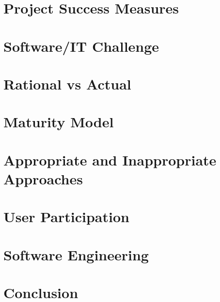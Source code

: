 \documentclass[a4paper,12pt]{scrartcl}
\begin{document}
	\section{Project Success Measures}
	{
		
	}
	\section{Software/IT Challenge}
	{
		
	}
	\section{Rational vs Actual}
	{
		
	}
	\section{Maturity Model}
	{
		
	}	
	\section{Appropriate and Inappropriate Approaches}
	{
		
	}
	\section{User Participation}
	{
		
	}
	\section{Software Engineering}
	{
		
	}
	\section{Conclusion}
	{

	}
	
	
	\newpage
	
	\printbibliography[heading=bibintoc,title=References]
\end{document}
